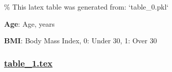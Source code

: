 \documentclass[11pt]{article}
\begin{document}
\begin{codeoutput}
\% This latex table was generated from: `table\_0.pkl`
\begin{table}[h]
\caption{Descriptive statistics of age and body mass index stratified by sex}
\label{table:descriptive\_statistics}
\begin{threeparttable}
\renewcommand{\TPTminimum}{\linewidth}
\begin{tablenotes}
\footnotesize
\item \textbf{Age}: Age, years
\item \textbf{BMI}: Body Mass Index, 0: Under 30, 1: Over 30
\end{tablenotes}
\end{threeparttable}
\end{table}
\end{codeoutput}

\subsubsection*{\hyperlink{code-LaTeX Table Design-table-1-tex}{table\_1.tex}}
\end{document}

